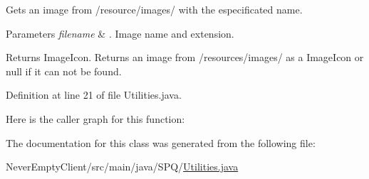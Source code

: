 Gets an image from /resource/images/ with the especificated name. 
\begin{DoxyParams}{Parameters}
{\em filename} & . Image name and extension. \\
\hline
\end{DoxyParams}
\begin{DoxyReturn}{Returns}
Image\+Icon. Returns an image from /resources/images/ as a Image\+Icon or null if it can not be found. 
\end{DoxyReturn}


Definition at line 21 of file Utilities.\+java.

Here is the caller graph for this function\+:


The documentation for this class was generated from the following file\+:\begin{DoxyCompactItemize}
\item 
Never\+Empty\+Client/src/main/java/\+S\+P\+Q/\mbox{\hyperlink{_utilities_8java}{Utilities.\+java}}\end{DoxyCompactItemize}
